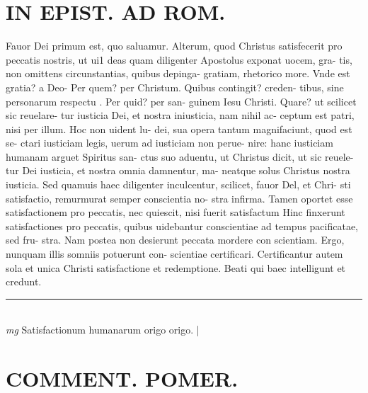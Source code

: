 \documentclass{article}
\begin{document}
\begin{pages}
\section*{IN EPIST. AD ROM.  }
\marginpar{[ p.34 ]}\pstart Fauor Dei primum est, quo saluamur. Alterum, quod Christus satisfecerit pro peccatis nostris, ut ui1 deas quam diligenter Apostolus exponat uocem, gra- tis, non omittens circunstantias, quibus depinga- gratiam, rhetorico more. Vnde est gratia? a Deo- Per quem? per Christum. Quibus contingit? creden- tibus, sine personarum respectu . Per quid? per san- guinem Iesu Christi. Quare? ut scilicet sic reuelare- tur iusticia Dei, et nostra iniusticia, nam nihil ac- ceptum est patri, nisi per illum. Hoc non uident lu- dei, sua opera tantum magnifaciunt, quod est se- ctari iusticiam legis, uerum ad iusticiam non perue- nire: hanc iusticiam humanam arguet Spiritus san- ctus suo aduentu, ut Christus dicit, ut sic reuele- tur Dei iusticia, et nostra omnia damnentur, ma- neatque solus Christus nostra iusticia. Sed quamuis haec diligenter inculcentur, scilicet, fauor Del, et Chri- sti satisfactio, remurmurat semper conscientia no- stra infirma. Tamen oportet esse satisfactionem pro peccatis, nec quiescit, nisi fuerit satisfactum Hinc finxerunt satisfactiones pro peccatis, quibus uidebantur conscientiae ad tempus pacificatae, sed fru- stra. Nam postea non desierunt peccata mordere con scientiam. Ergo, nunquam illis somniis potuerunt con- scientiae certificari. Certificantur autem sola et unica Christi satisfactione et redemptione. Beati qui baec intelligunt et credunt.   \pend
\vspace{0.5cm}\noindent
\vspace{0.2cm}\rule{1cm}{0.2pt}\\ 
\hspace{0.2cm}\textit{mg}
\footnotesize Satisfactionum humanarum origo origo. 
\normalsize| 
\section*{COMMENT. POMER. }
{}

\end{pages}
\end{document}
